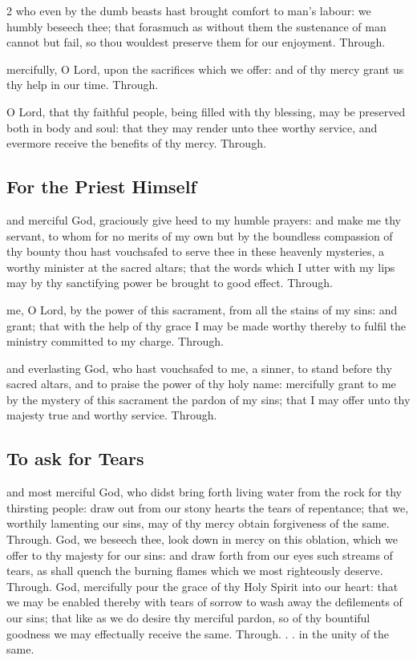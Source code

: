 \begin{multicols}{2}
\collect
{} who even by the dumb beasts hast brought comfort to man's labour: we humbly beseech thee; that forasmuch as without them the sustenance of man cannot but fail, so thou wouldest preserve them for our enjoyment. Through.

\secret
{} mercifully, O Lord, upon the sacrifices which we offer: and of thy mercy grant us thy help in our time. Through.

\postcommunion
{} O Lord, that thy faithful people, being filled with thy blessing, may be preserved both in body and soul: that they may render unto thee worthy service, and evermore receive the benefits of thy mercy. Through.


   \newcolumn

\subsection{For the Priest Himself}

\collect
{} and merciful God, graciously give heed to my humble prayers: and make me thy servant, to whom for no merits of my own but by the boundless compassion of thy bounty thou hast vouchsafed to serve thee in these heavenly mysteries, a worthy minister at the sacred altars; that the words which I utter with my lips may by thy sanctifying power be brought to good effect. Through.

\secret
{} me, O Lord, by the power of this sacrament, from all the stains of my sins: and grant; that with the help of thy grace I may be made worthy thereby to fulfil the ministry committed to my charge. Through.

\postcommunion
{} and everlasting God, who hast vouchsafed to me, a sinner, to stand before thy sacred altars, and to praise the power of thy holy name: mercifully grant to me by the mystery of this sacrament the pardon of my sins; that I may offer unto thy majesty true and worthy service. Through.


   \newcolumn


\subsection{To ask for Tears}
\collect
{} and most merciful God, who didst bring forth living water from the rock for thy thirsting people: draw out from our stony hearts the tears of repentance; that we, worthily lamenting our sins, may of thy mercy obtain forgiveness of the same. Through.
\secret
{} God, we beseech thee, look down in mercy on this oblation, which we offer to thy majesty for our sins: and draw forth from our eyes such streams of tears, as shall quench the burning flames which we most righteously deserve. Through.
\postcommunion
{} God, mercifully pour the grace of thy Holy Spirit into our heart: that we may be enabled thereby with tears of sorrow to wash away the defilements of our sins; that like as we do desire thy merciful pardon, so of thy bountiful goodness we may effectually receive the same. Through. . . in the unity of the same.


\end{multicols}
